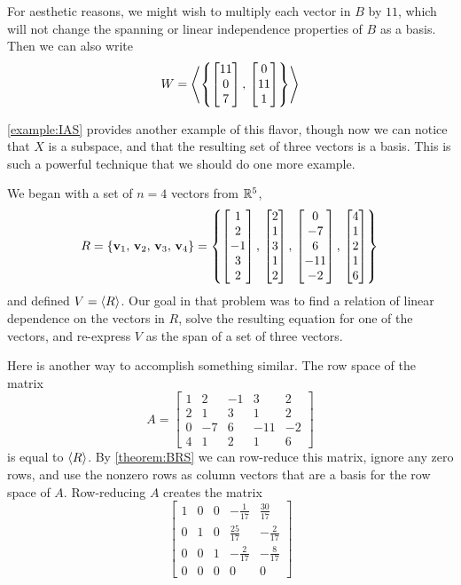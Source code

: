 \documentclass{ximera}
\begin{document}
\begin{example}
  For aesthetic reasons, we might wish to multiply each vector in $B$
  by $11$, which will not change the spanning or linear independence
  properties of $B$ as a basis.  Then we can also write
  \[
    W=\left\langle\left\{\begin{bmatrix}11\\0\\7\end{bmatrix},\,\begin{bmatrix}0\\11\\1\end{bmatrix}\right\}\right\rangle
  \]

\end{example}

\ref{example:IAS} provides another example of this flavor, though now
we can notice that $X$ is a subspace, and that the resulting set of
three vectors is a basis.  This is such a powerful technique that we
should do one more example.


\begin{example}
  We began with a set of $n=4$ vectors from $\mathbb{R}^{5}$,
  \[
    R=\left\{\mathbf{v}_1,\,\mathbf{v}_2,\,\mathbf{v}_3,\,\mathbf{v}_4\right\}
    =
    \left\{
      \begin{bmatrix}1\\2\\-1\\3\\2\end{bmatrix},\,
      \begin{bmatrix}2\\1\\3\\1\\2\end{bmatrix},\,
      \begin{bmatrix}0\\-7\\6\\-11\\-2\end{bmatrix},\,
      \begin{bmatrix}4\\1\\2\\1\\6\end{bmatrix}
    \right\}\\
  \]
  and defined $V=\left\langle R\right\rangle$.  Our goal in that problem was to find a
  relation of linear dependence on the vectors in $R$, solve the
  resulting equation for one of the vectors, and re-express $V$ as the
  span of a set of three vectors.

  Here is another way to accomplish something similar.  The row space
  of the matrix
  \[
    A=\begin{bmatrix}
      1 & 2 & -1 & 3 & 2\\
      2 & 1 & 3 & 1 & 2\\
      0 & -7 & 6 & -11 & -2\\
      4 & 1 & 2 & 1 & 6
    \end{bmatrix}
  \]
  is equal to $\left\langle R\right\rangle$.  By \ref{theorem:BRS} we can row-reduce this
  matrix, ignore any zero rows, and use the nonzero rows as column
  vectors that are a basis for the row space of $A$.  Row-reducing $A$
  creates the matrix
  \[
    \begin{bmatrix}
      1 & 0 & 0 & -\frac{1}{17} & \frac{30}{17}\\
      0 & 1 & 0 & \frac{25}{17} & -\frac{2}{17}\\
      0 & 0 & 1 & -\frac{2}{17} & -\frac{8}{17}\\
      0 & 0 & 0 & 0 & 0
    \end{bmatrix}
  \]


\end{example}
\end{document}
